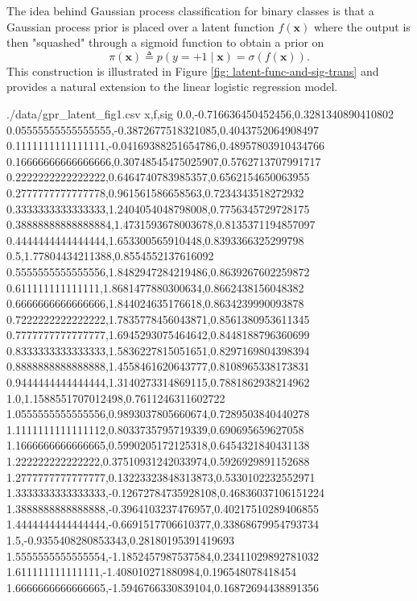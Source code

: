 The idea behind Gaussian process classification for binary classes is that a Gaussian process prior is placed over a latent function $f \left( \bm{x} \right)$ where the output is then "squashed" through a sigmoid function to obtain a prior on
\begin{equation*}
    \pi \left( \bm{x} \right) \triangleq p \left( y=+1 \mid \bm{x} \right) = \sigma \left( f \left( \bm{x} \right) \right).
\end{equation*}
This construction is illustrated in Figure \ref{fig: latent-func-and-sig-trans} and provides a natural extension to the linear logistic regression model.

\begin{filecontents*}{./data/gpr_latent_fig1.csv}
    x,f,sig
    0.0,-0.716636450452456,0.3281340890410802
    0.05555555555555555,-0.3872677518321085,0.4043752064908497
    0.1111111111111111,-0.04169388251654786,0.48957803910434766
    0.16666666666666666,0.30748545475025907,0.5762713707991717
    0.2222222222222222,0.6464740783985357,0.6562154650063955
    0.2777777777777778,0.961561586658563,0.7234343518272932
    0.3333333333333333,1.2404054048798008,0.7756345729728175
    0.38888888888888884,1.4731593678003678,0.8135371194857097
    0.4444444444444444,1.653300565910448,0.8393366325299798
    0.5,1.77804434211388,0.8554552137616092
    0.5555555555555556,1.8482947284219486,0.8639267602259872
    0.611111111111111,1.8681477880300634,0.8662438156048382
    0.6666666666666666,1.844024635176618,0.8634239990093878
    0.7222222222222222,1.7835778456043871,0.8561380953611345
    0.7777777777777777,1.6945293075464642,0.8448188796360699
    0.8333333333333333,1.5836227815051651,0.8297169804398394
    0.8888888888888888,1.4558461620643777,0.8108965338173831
    0.9444444444444444,1.3140273314869115,0.7881862938214962
    1.0,1.1588551707012498,0.7611246311602722
    1.0555555555555556,0.9893037805660674,0.7289503840440278
    1.1111111111111112,0.8033735795719339,0.690695659627058
    1.1666666666666665,0.5990205172125318,0.6454321840431138
    1.222222222222222,0.37510931242033974,0.5926929891152688
    1.2777777777777777,0.13223323848313873,0.5330102232552971
    1.3333333333333333,-0.12672784735928108,0.46836037106151224
    1.3888888888888888,-0.3964103237476957,0.40217510289406855
    1.4444444444444444,-0.6691517706610377,0.33868679954793734
    1.5,-0.9355408280853343,0.28180195391419693
    1.5555555555555554,-1.1852457987537584,0.23411029892781032
    1.611111111111111,-1.408010271880984,0.196548078418454
    1.6666666666666665,-1.5946766330839104,0.16872694438891356

\end{filecontents*}
